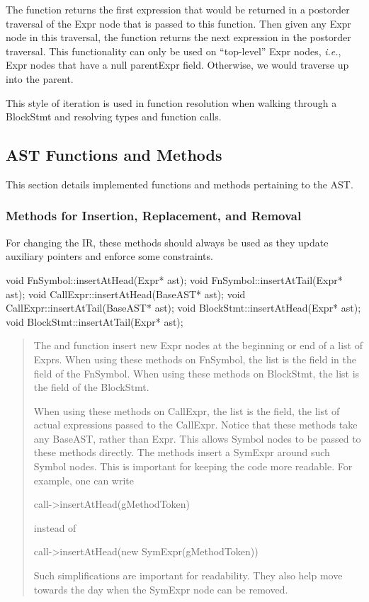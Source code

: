 \documentclass[10pt]{article}
\newcommand{\ie}{\emph{i.e.}}
\begin{document}
The function  returns the first expression that would
be returned in a postorder traversal of the Expr node that is passed
to this function.  Then given any Expr node in this traversal, the
function  returns the next expression in the postorder
traversal.  This functionality can only be used on ``top-level'' Expr
nodes, \ie, Expr nodes that have a null parentExpr field.  Otherwise,
we would traverse up into the parent.

This style of iteration is used in function resolution when walking
through a BlockStmt and resolving types and function calls.

\subsection{AST Functions and Methods}

This section details implemented functions and methods pertaining to
the AST.

\subsubsection{Methods for Insertion, Replacement, and Removal}
\label{sec:inserts}

For changing the IR, these methods should always be used as they
update auxiliary pointers and enforce some constraints.

\begin{clang}
void FnSymbol::insertAtHead(Expr* ast);
void FnSymbol::insertAtTail(Expr* ast);
void CallExpr::insertAtHead(BaseAST* ast);
void CallExpr::insertAtTail(BaseAST* ast);
void BlockStmt::insertAtHead(Expr* ast);
void BlockStmt::insertAtTail(Expr* ast);
\end{clang}
\begin{quote}
The  and  function insert new
Expr nodes at the beginning or end of a list of Exprs.  When using
these methods on FnSymbol, the list is the  field in the
 field of the FnSymbol.  When using these methods
on BlockStmt, the list is the  field of the BlockStmt.

When using these methods on CallExpr, the list is the 
field, the list of actual expressions passed to the CallExpr.  Notice
that these methods take any BaseAST, rather than Expr.  This allows
Symbol nodes to be passed to these methods directly.  The methods
insert a SymExpr around such Symbol nodes.  This is important for
keeping the code more readable.  For example, one can write
\begin{clang}
call->insertAtHead(gMethodToken)
\end{clang}
instead of
\begin{clang}
call->insertAtHead(new SymExpr(gMethodToken))
\end{clang}
Such simplifications are important for readability.  They also help
move towards the day when the SymExpr node can be removed.
\end{quote}
\end{document}
